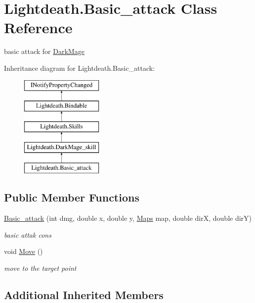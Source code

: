 \hypertarget{class_lightdeath_1_1_basic__attack}{}\section{Lightdeath.\+Basic\+\_\+attack Class Reference}
\label{class_lightdeath_1_1_basic__attack}


basic attack for \hyperlink{class_lightdeath_1_1_dark_mage}{Dark\+Mage}  


Inheritance diagram for Lightdeath.\+Basic\+\_\+attack\+:\begin{figure}[H]
\begin{center}
\leavevmode
\includegraphics[height=5.000000cm]{class_lightdeath_1_1_basic__attack}
\end{center}
\end{figure}
\subsection*{Public Member Functions}
\begin{DoxyCompactItemize}
\item 
\hyperlink{class_lightdeath_1_1_basic__attack_a60fba46f5e2593337a876eb0da27393a}{Basic\+\_\+attack} (int dmg, double x, double y, \hyperlink{class_lightdeath_1_1_maps}{Maps} map, double dirX, double dirY)
\begin{DoxyCompactList}\small\item\em basic attak cons \end{DoxyCompactList}\item 
void \hyperlink{class_lightdeath_1_1_basic__attack_a36c0c41a008f1a0118d60a042801e073}{Move} ()
\begin{DoxyCompactList}\small\item\em move to the target point \end{DoxyCompactList}\end{DoxyCompactItemize}
\subsection*{Additional Inherited Members}



